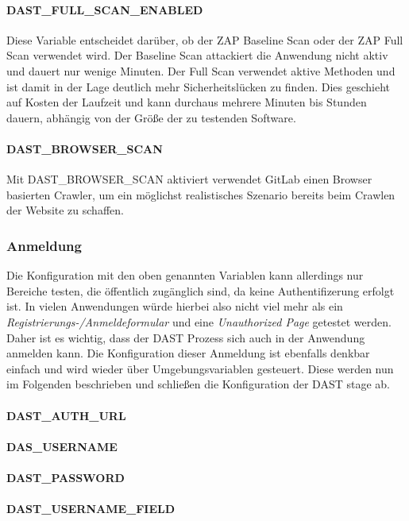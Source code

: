 \paragraph{DAST\_FULL\_SCAN\_ENABLED} Diese Variable entscheidet darüber, ob der ZAP Baseline Scan\cite{OWASPZAPBaseline} oder der ZAP Full Scan\cite{OWASPZAPFull} verwendet wird.
Der Baseline Scan attackiert die Anwendung nicht aktiv und dauert nur wenige Minuten. Der Full Scan verwendet aktive Methoden und ist damit in der Lage deutlich mehr Sicherheitslücken zu finden.
Dies geschieht auf Kosten der Laufzeit und kann durchaus mehrere Minuten bis Stunden dauern, abhängig von der Größe der zu testenden Software.
\paragraph{DAST\_BROWSER\_SCAN} Mit DAST\_BROWSER\_SCAN aktiviert verwendet GitLab einen Browser basierten Crawler, um ein möglichst realistisches Szenario bereits beim Crawlen der Website zu schaffen.

\subsubsection{Anmeldung}

Die Konfiguration mit den oben genannten Variablen kann allerdings nur Bereiche testen, die öffentlich zugänglich sind, da keine Authentifizerung erfolgt ist.
In vielen Anwendungen würde hierbei also nicht viel mehr als ein \textit{Registrierungs-/Anmeldeformular} und eine \textit{Unauthorized Page} getestet werden.
Daher ist es wichtig, dass der DAST Prozess sich auch in der Anwendung anmelden kann.
Die Konfiguration dieser Anmeldung ist ebenfalls denkbar einfach und wird wieder über Umgebungsvariablen gesteuert.
Diese werden nun im Folgenden beschrieben und schließen die Konfiguration der DAST stage ab.

\paragraph{DAST\_AUTH\_URL}
\paragraph{DAS\_USERNAME}
\paragraph{DAST\_PASSWORD}
\paragraph{DAST\_USERNAME\_FIELD}
